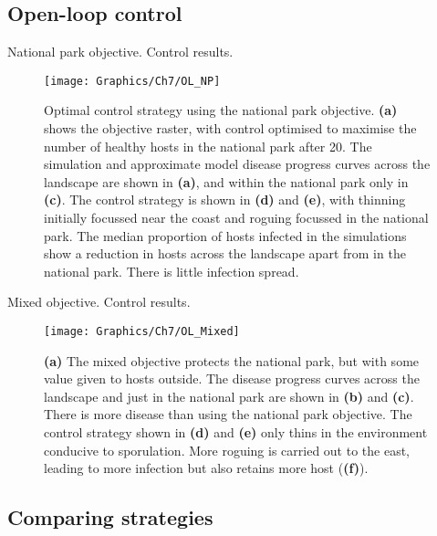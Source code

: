 \subsection{Open-loop control}

National park objective. Control results.

\begin{figure}
    \begin{center}
        \texttt{[image: Graphics/Ch7/OL\_NP]}
        \caption[Optimal control strategy to protect the national park]{Optimal control strategy using the national park objective. \textbf{(a)} shows the objective raster, with control optimised to maximise the number of healthy hosts in the national park after \SI{20}{\years}. The simulation and approximate model disease progress curves across the landscape are shown in \textbf{(a)}, and within the national park only in \textbf{(c)}. The control strategy is shown in \textbf{(d)} and \textbf{(e)}, with thinning initially focussed near the coast and roguing focussed in the national park. The median proportion of hosts infected in the simulations show a reduction in hosts across the landscape apart from in the national park. There is little infection spread.}
    \end{center}
\end{figure}

Mixed objective. Control results.

\begin{figure}
    \begin{center}
        \texttt{[image: Graphics/Ch7/OL\_Mixed]}
        \caption[Optimal control strategy using the mixed objective]{\textbf{(a)} The mixed objective protects the national park, but with some value given to hosts outside. The disease progress curves across the landscape and just in the national park are shown in \textbf{(b)} and \textbf{(c)}. There is more disease than using the national park objective. The control strategy shown in \textbf{(d)} and \textbf{(e)} only thins in the environment conducive to sporulation. More roguing is carried out to the east, leading to more infection but also retains more host (\textbf{(f)}).}
    \end{center}
\end{figure}

\subsection{Comparing strategies}


